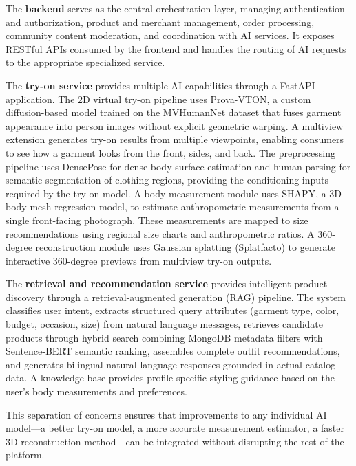 The \textbf{backend} serves as the central orchestration layer, managing authentication and authorization, product and merchant management, order processing, community content moderation, and coordination with AI services. It exposes RESTful APIs consumed by the frontend and handles the routing of AI requests to the appropriate specialized service.

The \textbf{try-on service} provides multiple AI capabilities through a FastAPI application. The 2D virtual try-on pipeline uses Prova-VTON, a custom diffusion-based model trained on the MVHumanNet dataset that fuses garment appearance into person images without explicit geometric warping. A multiview extension generates try-on results from multiple viewpoints, enabling consumers to see how a garment looks from the front, sides, and back. The preprocessing pipeline uses DensePose for dense body surface estimation and human parsing for semantic segmentation of clothing regions, providing the conditioning inputs required by the try-on model. A body measurement module uses SHAPY, a 3D body mesh regression model, to estimate anthropometric measurements from a single front-facing photograph. These measurements are mapped to size recommendations using regional size charts and anthropometric ratios. A 360-degree reconstruction module uses Gaussian splatting (Splatfacto) to generate interactive 360-degree previews from multiview try-on outputs.

The \textbf{retrieval and recommendation service} provides intelligent product discovery through a retrieval-augmented generation (RAG) pipeline. The system classifies user intent, extracts structured query attributes (garment type, color, budget, occasion, size) from natural language messages, retrieves candidate products through hybrid search combining MongoDB metadata filters with Sentence-BERT semantic ranking, assembles complete outfit recommendations, and generates bilingual natural language responses grounded in actual catalog data. A knowledge base provides profile-specific styling guidance based on the user's body measurements and preferences.

This separation of concerns ensures that improvements to any individual AI model—a better try-on model, a more accurate measurement estimator, a faster 3D reconstruction method—can be integrated without disrupting the rest of the platform.

